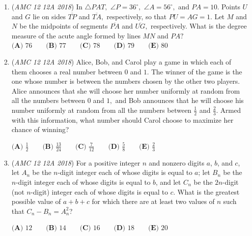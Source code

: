 \begin{enumerate}
	\item (\textit{AMC 12 12A 2018}) In $\triangle PAT,$ $\angle P=36^{\circ},$ $\angle A=56^{\circ},$ and $PA=10.$ Points $U$ and $G$ lie on sides $\overline{TP}$ and $\overline{TA},$ respectively, so that $PU=AG=1.$ Let $M$ and $N$ be the midpoints of segments $\overline{PA}$ and $\overline{UG},$ respectively. What is the degree measure of the acute angle formed by lines $MN$ and $PA?$
$\textbf{(A) } 76 \qquad  \textbf{(B) } 77 \qquad  \textbf{(C) } 78 \qquad  \textbf{(D) } 79 \qquad  \textbf{(E) } 80$


	\item (\textit{AMC 12 12A 2018}) Alice, Bob, and Carol play a game in which each of them chooses a real number between $0$ and $1.$ The winner of the game is the one whose number is between the numbers chosen by the other two players. Alice announces that she will choose her number uniformly at random from all the numbers between $0$ and $1,$ and Bob announces that he will choose his number uniformly at random from all the numbers between $\frac{1}{2}$ and $\frac{2}{3}.$ Armed with this information, what number should Carol choose to maximize her chance of winning?


 $\textbf{(A) }\frac{1}{2}\qquad \textbf{(B) }\frac{13}{24} \qquad \textbf{(C) }\frac{7}{12} \qquad \textbf{(D) }\frac{5}{8} \qquad \textbf{(E) }\frac{2}{3}\qquad$


	\item (\textit{AMC 12 12A 2018}) For a positive integer $n$ and nonzero digits $a$, $b$, and $c$, let $A_n$ be the $n$-digit integer each of whose digits is equal to $a$; let $B_n$ be the $n$-digit integer each of whose digits is equal to $b$, and let $C_n$ be the $2n$-digit (not $n$-digit) integer each of whose digits is equal to $c$. What is the greatest possible value of $a + b + c$ for which there are at least two values of $n$ such that $C_n - B_n = A_n^2$?


 $\textbf{(A) } 12 \qquad \textbf{(B) } 14 \qquad \textbf{(C) } 16 \qquad \textbf{(D) } 18 \qquad \textbf{(E) } 20$


\end{enumerate}